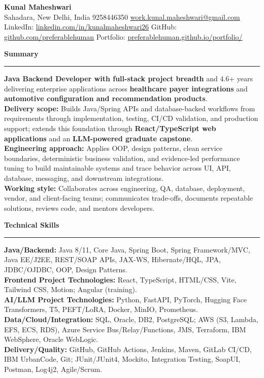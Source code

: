 \documentclass[11pt,letterpaper]{article}
\newcommand{\ressection}[1]{\Needspace{6\baselineskip}\vspace{8pt}\par\textbf{#1}\par\vspace{2pt}\hrule\vspace{5pt}}
\begin{document}
\pagestyle{empty}\raggedright\fontsize{11}{12.5}\selectfont

{\Large \textbf{Kunal Maheshwari}}\\
Sahadara, New Delhi, India \textbar{} 9258446350 \textbar{} \href{mailto:work.kunal.maheshwari@gmail.com}{work.kunal.maheshwari@gmail.com}\\
LinkedIn: \href{https://www.linkedin.com/in/kunalmaheshwari26}{linkedin.com/in/kunalmaheshwari26} \textbar{} GitHub: \href{https://github.com/preferablehuman}{github.com/preferablehuman} \textbar{} Portfolio: \href{https://preferablehuman.github.io/portfolio/}{preferablehuman.github.io/portfolio/}

\ressection{Summary}
\textbf{Java Backend Developer with full-stack project breadth} and 4.6+ years delivering enterprise applications across \textbf{healthcare payer integrations} and \textbf{automotive configuration and recommendation products}.\\[2pt]
\textbf{Delivery scope:} Builds Java/Spring APIs and database-backed workflows from requirements through implementation, testing, CI/CD validation, and production support; extends this foundation through \textbf{React/TypeScript web applications} and an \textbf{LLM-powered graduate capstone}.\\[2pt]
\textbf{Engineering approach:} Applies OOP, design patterns, clean service boundaries, deterministic business validation, and evidence-led performance tuning to build maintainable systems and trace behavior across UI, API, database, messaging, and downstream integrations.\\[2pt]
\textbf{Working style:} Collaborates across engineering, QA, database, deployment, vendor, and client-facing teams; communicates trade-offs, documents repeatable solutions, reviews code, and mentors developers.

\ressection{Technical Skills}
\textbf{Java/Backend:} Java 8/11, Core Java, Spring Boot, Spring Framework/MVC, Java EE/J2EE, REST/SOAP APIs, JAX-WS, Hibernate/HQL, JPA, JDBC/OJDBC, OOP, Design Patterns.\\
\textbf{Frontend Project Technologies:} React, TypeScript, HTML/CSS, Vite, Tailwind CSS, Motion; Angular (training).\\
\textbf{AI/LLM Project Technologies:} Python, FastAPI, PyTorch, Hugging Face Transformers, T5, PEFT/LoRA, Docker, MinIO, Prometheus.\\
\textbf{Data/Cloud/Integration:} SQL, Oracle, DB2, PostgreSQL; AWS (S3, Lambda, EFS, ECS, RDS), Azure Service Bus/Relay/Functions, JMS, Terraform, IBM WebSphere, Oracle WebLogic.\\
\textbf{Delivery/Quality:} GitHub, GitHub Actions, Jenkins, Maven, GitLab CI/CD, IBM UrbanCode, Git; JUnit/JUnit4, Mockito, Integration Testing, SoapUI, Postman, Log4j2, Agile/Scrum.
\end{document}
